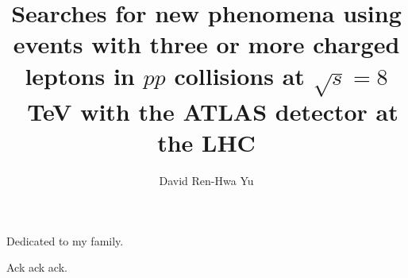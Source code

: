 \documentclass[english]{ucbthesis}
\begin{document}

\title{Searches for new phenomena using events with three or more charged leptons in $pp$ collisions at $\sqrt{s}=8$~TeV with the ATLAS detector at the LHC}
\author{David Ren-Hwa Yu}




\maketitle
\approvalpage
\copyrightpage



\begin{frontmatter}

\begin{dedication}
\null\vfil
\begin{center}
Dedicated to my family.
\end{center}
\vfil\null
\end{dedication}

\tableofcontents
\clearpage

\begin{acknowledgements}
Ack ack ack.

\end{acknowledgements}

\end{frontmatter}

\pagestyle{headings}













\end{document}
